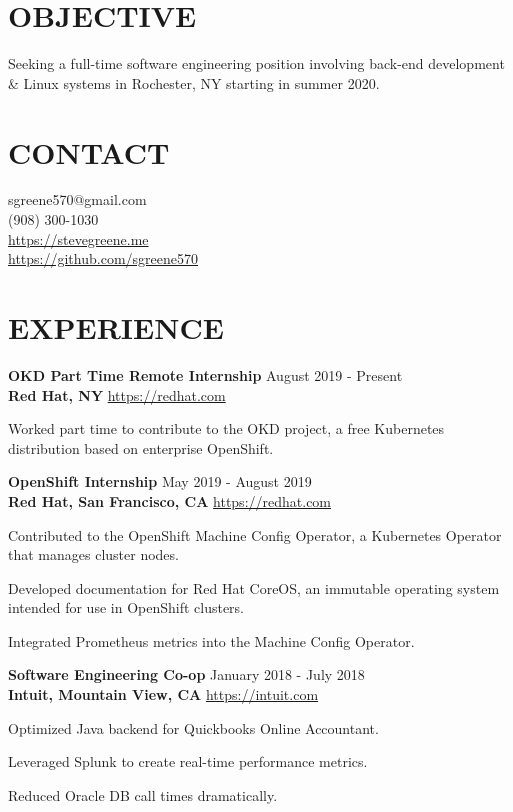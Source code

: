 \documentclass[line, margin, 11pt]{res}
\begin{document}

\begin{resume}

\section{\small OBJECTIVE}
Seeking a full-time software engineering position involving back-end development
    \& Linux systems in Rochester, NY starting in summer 2020.

\section{\small CONTACT}
sgreene570@gmail.com \\
(908) 300-1030 \\
\url{https://stevegreene.me} \\
\url{https://github.com/sgreene570}

\section{\small EXPERIENCE}
{\bf \large{OKD Part Time Remote Internship}} \hfill August 2019 - Present \\
{\bf Red Hat, NY} \hfill \url{https://redhat.com}
\begin{compactitem}
    \item Worked part time to contribute to the OKD project, a free Kubernetes distribution based on enterprise OpenShift.
\end{compactitem}


{\bf \large{OpenShift Internship}} \hfill May 2019 - August 2019 \\
{\bf Red Hat, San Francisco, CA} \hfill \url{https://redhat.com}
\begin{compactitem}
    \item Contributed to the OpenShift Machine Config Operator, a Kubernetes Operator that manages cluster nodes.
    \item Developed documentation for Red Hat CoreOS, an immutable operating system intended for use in OpenShift clusters.
    \item Integrated Prometheus metrics into the Machine Config Operator.
\end{compactitem}


{\bf \large{Software Engineering Co-op}} \hfill January 2018 - July 2018 \\
{\bf Intuit, Mountain View, CA} \hfill \url{https://intuit.com}
\begin{compactitem}
    \item Optimized Java backend for Quickbooks Online Accountant.
    \item Leveraged Splunk to create real-time performance metrics.
    \item Reduced Oracle DB call times dramatically.
\end{compactitem}


\end{resume}
\end{document}
